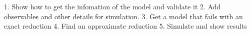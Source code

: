 1. Show how to get the infomation of the model and validate it
2. Add observables and other details for simulation.
3. Get a model that fails with an exact reduction  
4. Find an approximate reduction 
5. Simulate and show results

